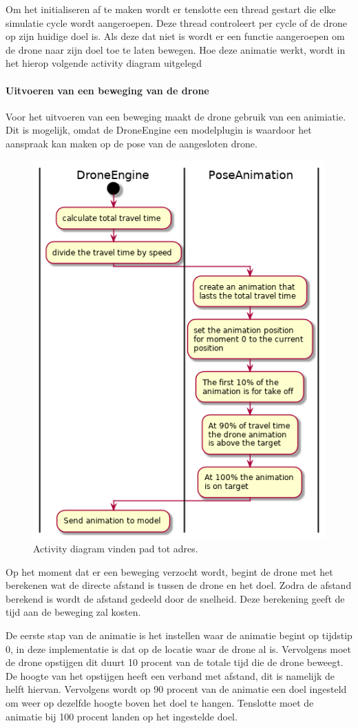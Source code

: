 \documentclass[a4paper, 11pt, oneside]{report}
\begin{document}
Om het initialiseren af te maken wordt er tenslotte een thread gestart die elke simulatie cycle wordt aangeroepen.
Deze thread controleert per cycle of de drone op zijn huidige doel is.
Als deze dat niet is wordt er een functie aangeroepen om de drone naar zijn doel toe te laten bewegen.
Hoe deze animatie werkt, wordt in het hierop volgende activity diagram uitgelegd   


\paragraph{Uitvoeren van een beweging van de drone}
\label{DetailedDesign:MeshNetwerk:Activity:AnimatieDrone}
Voor het uitvoeren van een beweging maakt de drone gebruik van een animiatie. 
Dit is mogelijk, omdat de DroneEngine een modelplugin is waardoor het aanspraak kan maken op de pose van de aangesloten drone.
  

\begin{figure}[H]
	\begin{center}\includegraphics[width=.45\linewidth]{UML/out/DroneSimulation/Activity/DroneMovement/DroneMovement.png}\end{center}
	\caption{Activity diagram vinden pad tot adres.}
	\label{fig:communication:MeshNetwerk:Activity:AnimatieDrone}
\end{figure}

Op het moment dat er een beweging verzocht wordt, begint de drone met het berekenen wat de directe afstand is tussen de drone en het doel.
Zodra de afstand berekend is wordt de afstand gedeeld door de snelheid. Deze berekening geeft de tijd aan de beweging zal kosten.

De eerste stap van de animatie is het instellen waar de animatie begint op tijdstip 0, in deze implementatie is dat op de locatie waar de drone al is.
Vervolgens moet de drone opstijgen dit duurt 10 procent van de totale tijd die de drone beweegt.
De hoogte van het opstijgen heeft een verband met afstand, dit is namelijk de helft hiervan.
Vervolgens wordt op 90 procent van de animatie een doel ingesteld om weer op dezelfde hoogte boven het doel te hangen.
Tenslotte moet de animatie bij 100 procent landen op het ingestelde doel.
\end{document}
